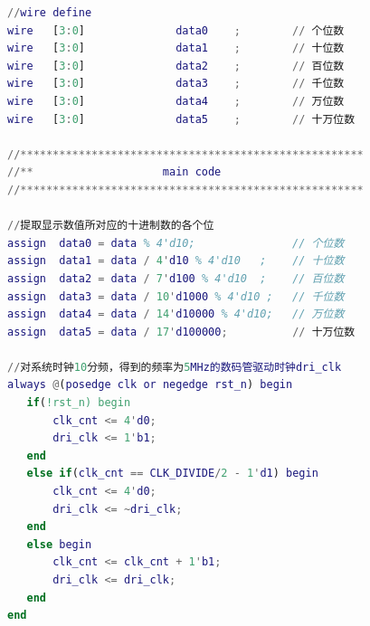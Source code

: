 \documentclass[UTF8]{article}
\theoremstyle{MyLineTheoremStyle} %
\theoremstyle{MyBlockTheoremStyle} %
\theoremstyle{MySubsubsectionStyle} %
\begin{document}
\begin{lstlisting}[language=Matlab, style=MatlabStyle_src]
//wire define
wire   [3:0]              data0    ;        // 个位数
wire   [3:0]              data1    ;        // 十位数
wire   [3:0]              data2    ;        // 百位数
wire   [3:0]              data3    ;        // 千位数
wire   [3:0]              data4    ;        // 万位数
wire   [3:0]              data5    ;        // 十万位数

//*****************************************************
//**                    main code
//*****************************************************

//提取显示数值所对应的十进制数的各个位
assign  data0 = data % 4'd10;               // 个位数
assign  data1 = data / 4'd10 % 4'd10   ;    // 十位数
assign  data2 = data / 7'd100 % 4'd10  ;    // 百位数
assign  data3 = data / 10'd1000 % 4'd10 ;   // 千位数
assign  data4 = data / 14'd10000 % 4'd10;   // 万位数
assign  data5 = data / 17'd100000;          // 十万位数

//对系统时钟10分频，得到的频率为5MHz的数码管驱动时钟dri_clk
always @(posedge clk or negedge rst_n) begin
   if(!rst_n) begin
       clk_cnt <= 4'd0;
       dri_clk <= 1'b1;
   end
   else if(clk_cnt == CLK_DIVIDE/2 - 1'd1) begin
       clk_cnt <= 4'd0;
       dri_clk <= ~dri_clk;
   end
   else begin
       clk_cnt <= clk_cnt + 1'b1;
       dri_clk <= dri_clk;
   end
end


\end{lstlisting}
\end{document}
